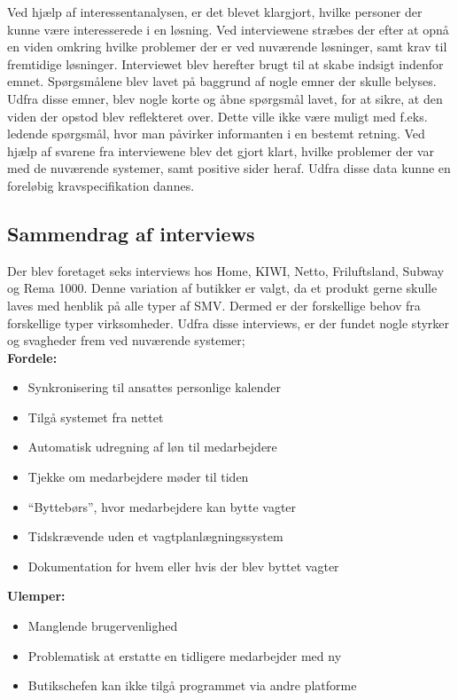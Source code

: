 Ved hjælp af interessentanalysen, er det blevet klargjort, hvilke personer der kunne være interesserede i en løsning. Ved interviewene stræbes der efter at opnå en viden omkring hvilke problemer der er ved nuværende løsninger, samt krav til fremtidige løsninger. Interviewet blev herefter brugt til at skabe indsigt indenfor emnet. Spørgsmålene blev lavet på baggrund af nogle emner der skulle belyses. Udfra disse emner, blev nogle korte og åbne spørgsmål lavet, for at sikre, at den viden der opstod blev reflekteret over. Dette ville ikke være muligt med f.eks. ledende spørgsmål, hvor man påvirker informanten i en bestemt retning. Ved hjælp af svarene fra interviewene blev det gjort klart, hvilke problemer der var med de nuværende systemer, samt positive sider heraf. Udfra disse data kunne en foreløbig kravspecifikation dannes.
\\
\subsection{Sammendrag af interviews}
Der blev foretaget seks interviews hos Home, KIWI, Netto, Friluftsland, Subway og Rema 1000. Denne variation af butikker er valgt, da et produkt gerne skulle laves med henblik på alle typer af SMV. Dermed er der forskellige behov fra forskellige typer virksomheder. Udfra disse interviews, er der fundet nogle styrker og svagheder frem ved nuværende systemer;\\

\textbf{Fordele:}
\begin{itemize}
\setlength\itemsep{0.3em}
\item Synkronisering til ansattes personlige kalender
\item Tilgå systemet fra nettet
\item Automatisk udregning af løn til medarbejdere
\item Tjekke om medarbejdere møder til tiden
\item “Byttebørs”, hvor medarbejdere kan bytte vagter
\item Tidskrævende uden et vagtplanlægningssystem
\item Dokumentation for hvem eller hvis der blev byttet vagter\\
\end{itemize}

\textbf{Ulemper:}
\begin{itemize}
\item Manglende brugervenlighed
\item Problematisk at erstatte en tidligere medarbejder med ny
\item Butikschefen kan ikke tilgå programmet via andre platforme\\
\end{itemize}

